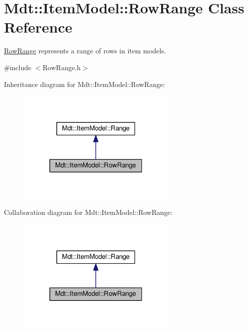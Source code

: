 \hypertarget{class_mdt_1_1_item_model_1_1_row_range}{}\section{Mdt\+:\+:Item\+Model\+:\+:Row\+Range Class Reference}
\label{class_mdt_1_1_item_model_1_1_row_range}


\hyperlink{class_mdt_1_1_item_model_1_1_row_range}{Row\+Range} represents a range of rows in item models.  




{\ttfamily \#include $<$Row\+Range.\+h$>$}



Inheritance diagram for Mdt\+:\+:Item\+Model\+:\+:Row\+Range\+:
\nopagebreak
\begin{figure}[H]
\begin{center}
\leavevmode
\includegraphics[width=220pt]{class_mdt_1_1_item_model_1_1_row_range__inherit__graph}
\end{center}
\end{figure}


Collaboration diagram for Mdt\+:\+:Item\+Model\+:\+:Row\+Range\+:
\nopagebreak
\begin{figure}[H]
\begin{center}
\leavevmode
\includegraphics[width=220pt]{class_mdt_1_1_item_model_1_1_row_range__coll__graph}
\end{center}
\end{figure}
